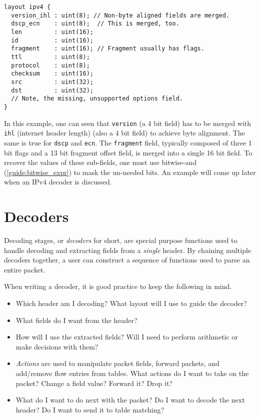 \begin{codepage}
\begin{lstlisting}
layout ipv4 {
  version_ihl : uint(8); // Non-byte aligned fields are merged.
  dscp_ecn    : uint(8);  // This is merged, too.
  len         : uint(16);
  id          : uint(16);
  fragment    : uint(16); // Fragment usually has flags.
  ttl         : uint(8);
  protocol    : uint(8);
  checksum    : uint(16);
  src         : uint(32);
  dst         : uint(32);
  // Note, the missing, unsupported options field.
}
\end{lstlisting}
\end{codepage}

In this example, one can seen that \texttt{version} (a 4 bit field) has to be
merged with \texttt{ihl} (internet header length) (also a 4 bit field) to
achieve byte alignment. The same is true for \texttt{dscp} and \texttt{ecn}. The
\texttt{fragment} field, typically composed of three 1 bit flags and a 13 bit
fragment offset field, is merged into a single 16 bit field. To recover the
values of these sub-fields, one must use bitwise-and
(\ref{guide:bitwise_expr}) to mask the un-needed bits. An example will come up
later when an IPv4 decoder is discussed.

\section{Decoders} \label{tut:decoder}

Decoding stages, or \textit{decoders} for short, are special purpose functions
used to handle decoding and extracting fields from a \textit{single} header. By
chaining multiple decoders together, a user can construct a sequence of
functions used to parse an entire packet.

When writing a decoder, it is good practice to keep the following in mind.

\begin{itemize}
\item Which header am I decoding? What layout will I use to guide the decoder?

\item What fields do I want from the header?

\item How will I use the extracted fields? Will I need to perform arithmetic or
make decisions with them?

\item \textit{Actions} are used to manipulate packet fields, forward packets,
and add/remove flow entries from tables. What actions do I want to take on the
packet? Change a field value? Forward it? Drop it?

\item What do I want to do next with the packet? Do I want to decode the next
header? Do I want to send it to table matching?
\end{itemize}

